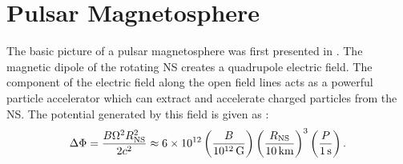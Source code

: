 \section{Pulsar Magnetosphere}

The basic picture of a pulsar magnetosphere was first presented in
\cite{goldreich_1969_pulsar-electrodynamics}.  The magnetic dipole
of the rotating \ac{NS} creates a quadrupole electric field.
The component of the electric field along the open field lines acts as
a powerful particle accelerator which can extract and accelerate charged
particles from the \ac{NS}. The potential generated
by this field is given as \citep{goldreich_1969_pulsar-electrodynamics}:
\begin{equation}
\Delta \Phi = \frac{B \Omega^2 R_\text{NS}^2}{2c^2}
\approx 6\times 10^{12} 
\left(\frac{B}{10^{12}\,\text{G}}\right)
\left(\frac{R_\text{NS}}{10\,\text{km}}\right)^3
\left(\frac{P}{1\,\text{s}}\right).
\end{equation}



